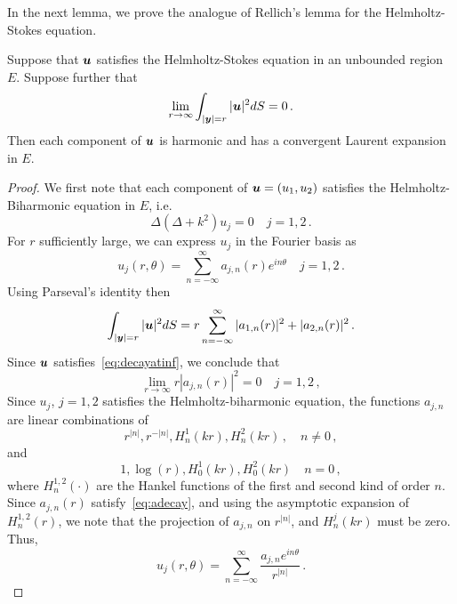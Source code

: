 In the next lemma, we prove the analogue of Rellich's lemma for the
Helmholtz-Stokes equation. 
\begin{lem}
\label{lem:rellich}
Suppose that ${\boldsymbol u}$ satisfies the Helmholtz-Stokes equation in an unbounded
region $E$.  
Suppose further that 
\begin{equation}
\lim_{r \to \infty} \int_{|{\boldsymbol y}|=r} |{\boldsymbol u}|^2 dS = 0 
\, . \label{eq:decayatinf}
\end{equation}
Then each component of ${\boldsymbol u}$ is harmonic and has a convergent Laurent
expansion in $E$.
\end{lem}
\begin{proof}
We first note that each component of ${\boldsymbol u}= (u_{1},u_{2})$ satisfies the 
Helmholtz-Biharmonic equation in $E$, i.e.
\begin{equation}
\Delta (\Delta + k^2) u_{j} = 0 \quad j=1,2 \,. 
\end{equation}
For $r$ sufficiently large, we can express $u_{j}$ in the Fourier basis as
\begin{equation}
u_{j}(r,\theta) = \sum_{n=-\infty}^{\infty} a_{j,n}(r) e^{i n \theta}  \quad 
j=1,2 \, .
\end{equation}
Using Parseval's identity then
\begin{equation}
\int_{|{\boldsymbol y}|=r} |{\boldsymbol u}|^2 dS = r\sum_{n=-\infty}^{\infty} |a_{1,n}(r)|^2  +
|a_{2,n}(r)|^2 \, .
\end{equation}
Since ${\boldsymbol u}$ satisfies~\cref{eq:decayatinf}, we conclude that
\begin{equation}
\lim_{r\to\infty} r|a_{j,n}(r)|^2 = 0 \quad j=1,2 \, , \label{eq:adecay}
\end{equation}
Since $u_{j}$, $j=1,2$ satisfies the Helmholtz-biharmonic equation,
the functions $a_{j,n}$ are linear combinations of 
\begin{equation}
r^{|n|}, r^{-|n|}, H^{1}_{n}(k r), H^{2}_{n}(k r) \, , \quad
n\neq 0 \, ,
\end{equation}
and
\begin{equation}
1, \log{(r)}, H^{1}_{0}(k r), H^{2}_{0}(k r) \quad n=0 \, , 
\end{equation} 
where $H_{n}^{1,2}(\cdot)$ are the Hankel functions of the first and
second kind of order $n$.
Since $a_{j,n}(r)$ satisfy~\cref{eq:adecay}, and using the asymptotic 
expansion of $H_{n}^{1,2}(r)$, we note that the projection of 
$a_{j,n}$ on $r^{|n|}$, and $H_{n}^{j}(k r)$ must be zero. 
Thus, 
\begin{equation}
u_{j}(r,\theta) = \sum_{n=-\infty}^{\infty} \frac{a_{j,n} e^{i n \theta}}{r^{|n|}} 
\, .
\end{equation}
\end{proof}
